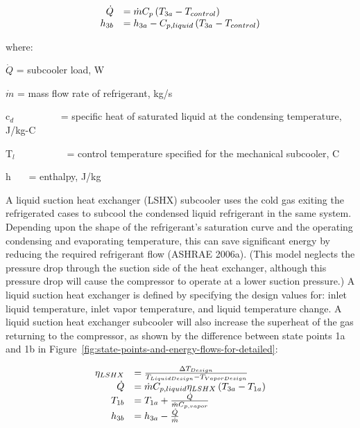 \begin{equation}
  \begin{array}{rl}
    \dot{Q} &= \dot{m} C_p \PB{T_{3a} - T_{control}} \\
    h_{3b}  &= h_{3a} - C_{p,liquid} \PB{T_{3a} - T_{control}}
  \end{array}
\end{equation}

where:

\(\dot Q\) = subcooler load, W

\(\dot m\) = mass flow rate of refrigerant, kg/s

c\(_{d}\)~~~~~~~~~ = specific heat of saturated liquid at the condensing temperature, J/kg-C

T\(_{l}\)~~~~~~~~~~ = control temperature specified for the mechanical subcooler, C

h~~~ = enthalpy, J/kg

A liquid suction heat exchanger (LSHX) subcooler uses the cold gas exiting the refrigerated cases to subcool the condensed liquid refrigerant in the same system. Depending upon the shape of the refrigerant's saturation curve and the operating condensing and evaporating temperature, this can save significant energy by reducing the required refrigerant flow (ASHRAE 2006a). (This model neglects the pressure drop through the suction side of the heat exchanger, although this pressure drop will cause the compressor to operate at a lower suction pressure.) A liquid suction heat exchanger is defined by specifying the design values for: inlet liquid temperature, inlet vapor temperature, and liquid temperature change. A liquid suction heat exchanger subcooler will also increase the superheat of the gas returning to the compressor, as shown by the difference between state points 1a and 1b in Figure~\ref{fig:state-points-and-energy-flows-for-detailed}:

\begin{equation}
  \begin{array}{rl}
    \eta_{LSHX} &= \frac{\Delta T_{Design}}{T_{Liquid Design} - T_{Vapor Design}} \\
    \dot{Q} &= \dot{m} C_{p,liquid} \eta_{LSHX} \PB{T_{3a} - T_{1a}} \\
    T_{1b} &= T_{1a} + \frac{\dot{Q}}{\dot{m}C_{p,vapor}} \\
    h_{3b} &= h_{3a} - \frac{\dot{Q}}{\dot{m}}
  \end{array}
\end{equation}

